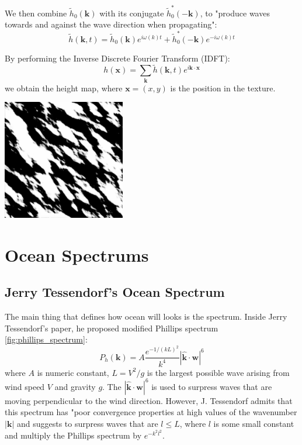 We then combine $\tilde{h}_0(\mathbf{k})$ with its conjugate $\tilde{h}^{*}_0(-\mathbf{k})$, to "produce waves towards and against the wave direction when propagating"\cite{horvath2015}:
\begin{equation}
    \tilde{h}(\mathbf{k}, t) = \tilde{h}_0(\mathbf{k})e^{i\omega(k)t}+\tilde{h}^{*}_0(-\mathbf{k})e^{-i\omega(k)t}
    \label{eq:combined_amplitudes}
\end{equation}

By performing the Inverse Discrete Fourier Transform (IDFT):
\begin{equation}
    h(\mathbf{x}) = \sum_{\mathbf{k}} \tilde{h}(\mathbf{k}, t)e^{i\mathbf{k}\cdot\mathbf{x}}
    \label{eq:height_map}
\end{equation}
we obtain the height map, where $\mathbf{x}=(x,y)$ is the position in the texture.

\begin{minipage}{1\textwidth}
    \centering
    \includegraphics[width=0.4\textwidth]{"images/philips_height_map.png"}
\end{minipage}

\section{Ocean Spectrums}
\subsection{Jerry Tessendorf's Ocean Spectrum}
The main thing that defines how ocean will looks is the spectrum. Inside Jerry Tessendorf's \cite{tessendorf2001} paper, he proposed modified Phillips spectrum \ref{fig:phillips_spectrum}:
\begin{equation}
    P_h(\mathbf{k}) = A \frac{e^{-1/(kL)^{2}}}{k^{4}}| \mathbf{\hat{k}} \cdot \mathbf{w} |^{6}
    \label{eq:tessendorf_spectrum}
\end{equation}
where $A$ is numeric constant, $L = V^2/g$ is the largest possible wave arising from wind speed $V$ and gravity $g$. The $| \mathbf{\hat{k}} \cdot \mathbf{w} |^{6}$ is used to surpress waves that are moving perpendicular to the wind direction.
However, J. Tessendorf admits that this spectrum has "poor convergence properties at high values of the wavenumber $|\mathbf{k}|$ and suggests to surpress waves that are $l \leq L$, where $l$ is some small constant and multiply the Phillips spectrum by $e^{-k^2l^2}$.

